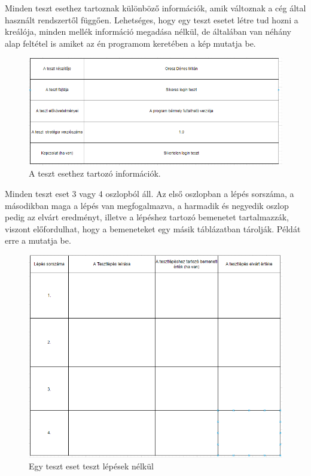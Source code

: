 Minden teszt esethez tartoznak különböző információk, amik változnak a cég által használt rendszertől függően. Lehetséges, hogy egy teszt esetet létre tud hozni a kreálója, minden mellék információ megadása nélkül, de általában van néhány alap feltétel is amiket az én programom keretében a  kép mutatja be.\\

\label {tab:template}
\label {tab:testcase}
\label {tab:successcase}

\begin{figure} [h]
	\centering
	\includegraphics[scale=0.86]{images/test_case_template.png}
	\caption{A teszt esethez tartozó információk.}
	\label{fig:template}
\end{figure}
Minden teszt eset 3 vagy 4 oszlopból áll. Az első oszlopban a lépés sorszáma, a másodikban  maga a lépés van megfogalmazva, a harmadik és negyedik oszlop pedig az elvárt eredményt, illetve a lépéshez tartozó bemenetet tartalmazzák, viszont előfordulhat, hogy a bemeneteket egy másik táblázatban tárolják. Példát erre a  mutatja be.\\

\begin{figure}[h]
	\centering
	\includegraphics[scale=0.86]{images/test_case.png}
	\caption{Egy teszt eset teszt lépések nélkül}
	\label{fig:testcase}
\end{figure}



